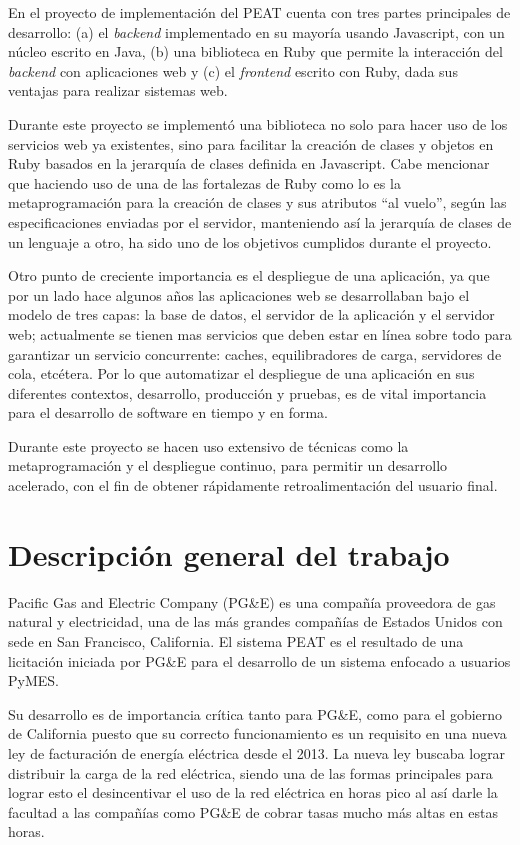 \documentclass{article}
\begin{document}
En el proyecto de implementación del PEAT cuenta con tres partes principales
de desarrollo: (a) el \textit{backend}  implementado en su mayoría usando
Javascript, con un núcleo escrito en Java, (b) una biblioteca en Ruby que permite
la interacción del \textit{backend} con aplicaciones web y (c) el \textit{frontend}
escrito con Ruby, dada sus ventajas para realizar sistemas web.

Durante este proyecto se implementó una biblioteca no solo para hacer uso de
los servicios web ya existentes, sino para facilitar la creación
de clases y objetos en Ruby basados en la jerarquía de clases definida
en Javascript. Cabe mencionar que haciendo uso de una de las fortalezas de Ruby
como lo es la metaprogramación para la creación de clases y sus
atributos ``al vuelo'', según las especificaciones enviadas por el servidor,
manteniendo así la jerarquía de clases de un lenguaje a otro, ha sido uno
de los objetivos cumplidos durante el proyecto.

Otro punto de creciente importancia es el despliegue de una aplicación, ya que por un
lado hace algunos años las aplicaciones web se desarrollaban bajo el modelo de
tres capas: la base de datos, el servidor de la aplicación y el servidor web; actualmente se tienen mas servicios
que deben estar en línea sobre todo para garantizar un servicio concurrente:
caches, equilibradores de carga, servidores de cola, etcétera. Por lo que
automatizar el despliegue de una aplicación en sus diferentes contextos,
desarrollo, producción y pruebas, es de vital importancia para el desarrollo
de software en tiempo y en forma.

Durante este proyecto se hacen uso extensivo de técnicas como la metaprogramación
y el despliegue continuo, para permitir un desarrollo acelerado, con el fin de
obtener rápidamente retroalimentación del usuario final.

\section{Descripción general del trabajo}
Pacific Gas and Electric Company (PG\&E) es una compañía proveedora de gas natural
y electricidad, una de las más grandes compañías de Estados Unidos con sede en
San Francisco, California. El sistema PEAT es el resultado de una licitación
iniciada por PG\&E para el desarrollo de un sistema enfocado a usuarios PyMES.

Su desarrollo es de importancia crítica tanto para PG\&E, como para el gobierno de
California puesto que su correcto funcionamiento es un requisito en una nueva
ley de facturación de energía eléctrica desde el 2013. La nueva ley buscaba
lograr distribuir la carga de la red eléctrica, siendo una de las formas
principales para lograr esto el desincentivar el uso de la red
eléctrica en horas pico al así darle la facultad a las compañías como PG\&E
de cobrar tasas mucho más altas en estas horas.
\end{document}
